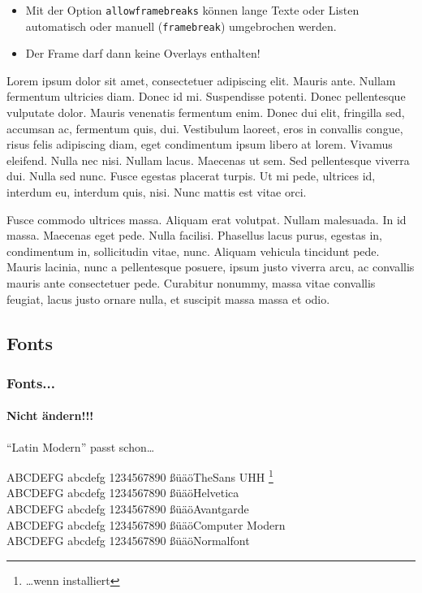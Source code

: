 \documentclass[usepdftitle=false, t]{beamer}
\begin{document}
\begin{frame}[allowframebreaks]
  \frametitle{\insertsubsection}
  \begin{itemize}
  \item Mit der Option \alert{\texttt{allowframebreaks}} können lange
    Texte  oder Listen automatisch oder manuell (\texttt{framebreak})
    umgebrochen werden.
  \item Der Frame darf dann keine Overlays enthalten!
  \end{itemize}

  Lorem ipsum dolor sit amet, consectetuer adipiscing elit. Mauris ante.
  Nullam fermentum ultricies diam. Donec id mi. Suspendisse potenti.
  Donec pellentesque vulputate dolor. Mauris venenatis fermentum enim.
  Donec dui elit, fringilla sed, accumsan ac, fermentum quis, dui.
  Vestibulum laoreet, eros in convallis congue, risus felis adipiscing diam,
  eget condimentum ipsum libero at lorem. Vivamus eleifend. Nulla nec nisi.
  Nullam lacus. Maecenas ut sem. Sed pellentesque viverra dui.
  Nulla sed nunc. Fusce egestas placerat turpis. Ut mi pede, ultrices id,
  interdum eu, interdum quis, nisi. Nunc mattis est vitae orci.

  Fusce commodo ultrices massa. Aliquam erat volutpat. Nullam malesuada.
  In id massa. Maecenas eget pede. Nulla facilisi. Phasellus lacus purus,
  egestas in, condimentum in, sollicitudin vitae, nunc. Aliquam vehicula
  tincidunt pede. Mauris lacinia, nunc a pellentesque posuere, ipsum justo
  viverra arcu, ac convallis mauris ante consectetuer pede. Curabitur nonummy,
  massa vitae convallis feugiat, lacus justo ornare nulla, et suscipit massa
  massa et odio.
\end{frame}

\subsection{Fonts}			%

\begin{frame}
  \frametitle{Fonts...}
  \framesubtitle{Nicht ändern!!!}
  "`Latin Modern"' passt schon\ldots\bvskip

  \selectfont
    ABCDEFG abcdefg 1234567890 ßüäö\hfill TheSans UHH%
	\footnote{\ldots wenn installiert}\\
  \selectfont
    ABCDEFG abcdefg 1234567890 ßüäö\hfill Helvetica\\
  \selectfont
    ABCDEFG abcdefg 1234567890 ßüäö\hfill Avantgarde\\
  \selectfont
    ABCDEFG abcdefg 1234567890 ßüäö\hfill Computer Modern\\
  \normalfont
    ABCDEFG abcdefg 1234567890 ßüäö\hfill Normalfont\\
\end{frame}
\end{document}
